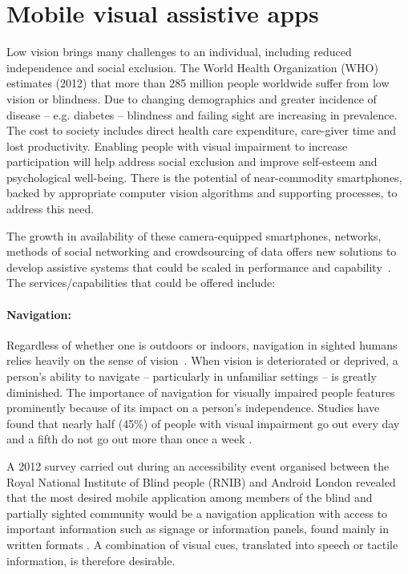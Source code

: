 \section{Mobile visual assistive apps}

Low vision brings many challenges to an individual, including reduced independence and social exclusion. The World Health Organization (WHO) estimates (2012) that more than 285 million people worldwide suffer from low vision or blindness. Due to changing demographics and greater incidence of disease -- e.g. diabetes -- blindness and failing sight are increasing in prevalence.  The cost to society includes direct health care expenditure, care-giver time and lost productivity.  Enabling people with visual impairment to increase participation will help address social exclusion and improve self-esteem and psychological well-being. There is the potential of near-commodity smartphones, backed by appropriate computer vision algorithms and supporting processes, to address this need.

The growth in availability of these camera-equipped smartphones, networks, methods of social networking and crowdsourcing of data offers new solutions to develop assistive systems that could be scaled in performance and capability~\cite{Manduchi2012,Worsfold2010}. The services/capabilities that could be offered include:

\paragraph{Navigation:} Regardless of whether one is outdoors or indoors, navigation in sighted humans relies heavily on the sense of vision~\citep{kalia2008learning,tsuji2005landmarks}. When vision is deteriorated or deprived, a person's ability to navigate -- particularly in unfamiliar settings -- is greatly diminished. The importance of navigation for visually impaired people features prominently because of its impact on a person's independence. Studies have found that nearly half (45\%) of people with visual impairment go out every day and a fifth do not go out more than once a week \citep{douglas2006network, RNIB2009}.

A 2012 survey carried out during an accessibility event organised between the Royal National Institute of Blind people (RNIB) and Android London revealed that the most desired mobile application among members of the blind and partially sighted community would be a navigation application with access to important information such as signage or information panels, found mainly in written formats \citep{RNIB2012}. A combination of visual cues, translated into speech or tactile information, is therefore desirable.

